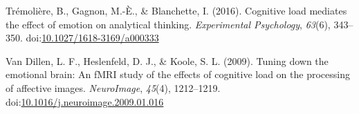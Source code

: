 \documentclass[man]{apa6}
\begin{document}
\leavevmode\hypertarget{ref-tremoliere_cognitive_2016}{}%
Trémolière, B., Gagnon, M.-È., \& Blanchette, I. (2016). Cognitive load mediates the effect of emotion on analytical thinking. \emph{Experimental Psychology}, \emph{63}(6), 343--350. doi:\href{https://doi.org/10.1027/1618-3169/a000333}{10.1027/1618-3169/a000333}

\leavevmode\hypertarget{ref-van_dillen_tuning_2009}{}%
Van Dillen, L. F., Heslenfeld, D. J., \& Koole, S. L. (2009). Tuning down the emotional brain: An fMRI study of the effects of cognitive load on the processing of affective images. \emph{NeuroImage}, \emph{45}(4), 1212--1219. doi:\href{https://doi.org/10.1016/j.neuroimage.2009.01.016}{10.1016/j.neuroimage.2009.01.016}

\endgroup
\end{document}
